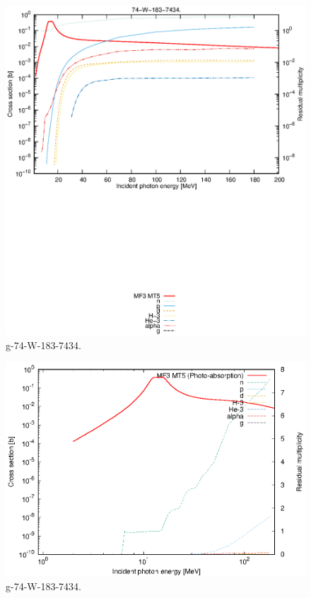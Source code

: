 \begin{figure}
 \includegraphics[width=\linewidth]{eps/g_74-W-183_7434.eps}
  \caption{g-74-W-183-7434.}
\end{figure}
\newpage \clearpage

\begin{figure}
 \includegraphics[width=\linewidth]{eps-log/g_74-W-183_7434.eps}
 \caption{g-74-W-183-7434.}
\end{figure}
\newpage \clearpage

